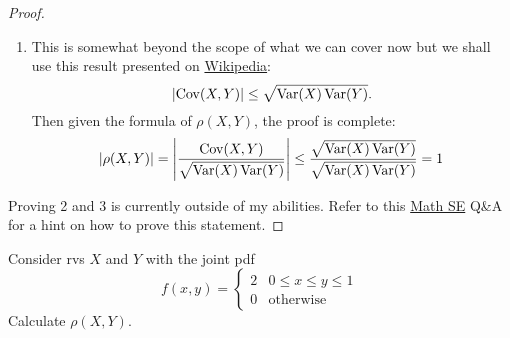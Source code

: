 \documentclass[notoc,notitlepage]{tufte-book}
\DeclareMathOperator{\Var}{Var }
\DeclareMathOperator{\Cov}{Cov }
\begin{document}
\begin{proof}
  \begin{enumerate}
    \item This is somewhat beyond the scope of what we can cover now but we shall use this result presented on \href{https://en.wikipedia.org/wiki/Covariance\#Relationship_to_inner_products}{Wikipedia}:
      \begin{equation*}
        \abs{ \Cov(X, Y) } \leq \sqrt{ \Var(X) \Var(Y) }.
      \end{equation*}
      Then given the formula of $\rho(X, Y)$, the proof is complete:
      \begin{equation*}
        \abs{ \rho(X, Y) } = \abs{ \frac{\Cov(X, Y)}{\sqrt{ \Var(X) \Var(Y) }} } \leq \frac{\sqrt{ \Var(X) \Var(Y) }}{\sqrt{ \Var(X) \Var(Y) }} = 1
      \end{equation*}
  \end{enumerate}
  Proving 2 and 3 is currently outside of my abilities. Refer to this \href{https://math.stackexchange.com/questions/478137/proving-y-ax-b-given-correlation-coefficient-rhox-y-1#478147}{Math SE} Q\&A for a hint on how to prove this statement.
\end{proof}

\begin{eg}[Example 3.20]
  Consider rvs $X$ and $Y$ with the joint pdf
  \begin{equation*}
    f(x, y) = \begin{cases}
      2 & 0 \leq x \leq y \leq 1 \\
      0 & \text{otherwise}
    \end{cases}
  \end{equation*}
  Calculate $\rho(X, Y)$.
\end{eg}
\end{document}
